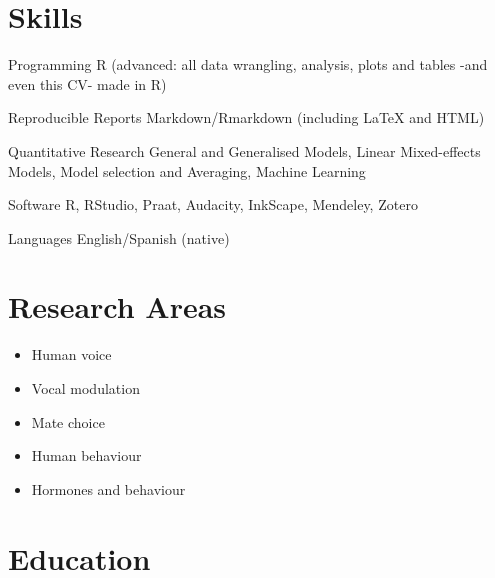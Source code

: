 \documentclass[11pt,a4paper,]{awesome-cv}
\providecommand{\tightlist}{%
	\setlength{\itemsep}{0pt}\setlength{\parskip}{0pt}}
\begin{document}
\hypertarget{skills}{%
\section{Skills}\label{skills}}

\begin{cvskills}
  \cvskill
    {Programming}
    {R (advanced: all data wrangling, analysis, plots and tables -and even this CV- made in R)}

  \cvskill
    {Reproducible Reports}
    {Markdown/Rmarkdown (including {\selectfont\LaTeX} and HTML)}

  \cvskill
    {Quantitative Research}
    {General and Generalised Models, Linear Mixed-effects Models, Model selection and Averaging, Machine Learning}

  \cvskill
    {Software}
    {R, RStudio, Praat, Audacity, InkScape, Mendeley, Zotero}

  \cvskill
    {Languages}
    {English/Spanish (native)}
\end{cvskills}

\hypertarget{research-areas}{%
\section{Research Areas}\label{research-areas}}

\begin{itemize}
\tightlist
\item
  Human voice
\item
  Vocal modulation
\item
  Mate choice
\item
  Human behaviour
\item
  Hormones and behaviour
\end{itemize}

\hypertarget{education}{%
\section{Education}\label{education}}
\end{document}
